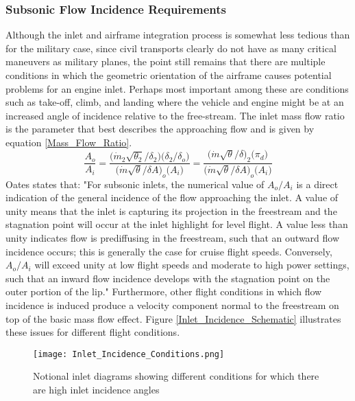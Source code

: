 		\subsubsection{Subsonic Flow Incidence Requirements}
		\indent Although the inlet and airframe integration process is somewhat less tedious than for the military case, since civil transports clearly do not have as many critical maneuvers as military planes, the point still remains that there are multiple conditions in which the geometric orientation of the airframe causes potential problems for an engine inlet.  Perhaps most important among these are conditions such as take-off, climb, and landing where the vehicle and engine might be at an increased angle of incidence relative to the free-stream.  The inlet mass flow ratio is the parameter that best describes the approaching flow and is given by equation \ref{Mass_Flow_Ratio}.
		\begin{equation}
			\frac{A_o}{A_i} = \frac{\Big(\dot{m}_2 \sqrt{\theta_2}/\delta_2\Big)\Big(\delta_2/\delta_o\Big)}{\Big(\dot{m}\sqrt{\theta}/\delta A\Big)_o\Big(A_i\Big)} = \frac{\Big(\dot{m}\sqrt{\theta}/\delta\Big)_2\Big(\pi_d\Big)}{\Big(\dot{m}\sqrt{\theta}/\delta A\Big)_o\Big(A_i\Big)}
			{}
			\label{Mass_Flow_Ratio}
		\end{equation}%
		\indent Oates states that:  "For subsonic inlets, the numerical value of $A_o/A_i$ is a direct indication of the general incidence of the flow approaching the inlet.  A value of unity means that the inlet is capturing its projection in the freestream and the stagnation point will occur at the inlet highlight for level flight.  A value less than unity indicates flow is prediffusing in the freestream, such that an outward flow incidence occurs; this is generally the case for cruise flight speeds.  Conversely,$A_o/A_i$ will exceed unity at low flight speeds and moderate to high power settings, such that an inward flow incidence develops with the stagnation point on the outer portion of the lip."  Furthermore, other flight conditions in which flow incidence is induced produce a velocity component normal to the freestream on top of the basic mass flow effect.   Figure \ref{Inlet_Incidence_Schematic} illustrates these issues \cite{Oates1989} for different flight conditions.
		\begin{figure}[htpb]
			\centering
			\texttt{[image: Inlet\_Incidence\_Conditions.png]}
			\caption{Notional inlet diagrams showing different conditions for which there are high inlet incidence angles \cite{Oates1989}}
			\label{Circumferential_Distortion}
		\end{figure}
